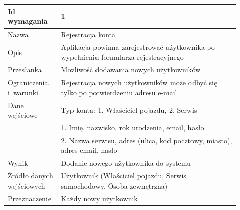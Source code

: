 \documentclass[12pt]{article}
\begin{document}
\begin{table}[H]
\begin{center}
	\begin{tabular}{|p{0.18\linewidth}|p{0.72\linewidth}|}%
	\hline
	Id wymagania 	& 1 				\\ \hline
	Nazwa			& Rejestracja konta \\ \hline
	Opis & Aplikacja powinna zarejestrować użytkownika po wypełnieniu
formularza rejestracyjnego\\ \hline
	Przesłanka & Możliwość dodawania nowych użytkowników  \\ \hline
	Ograniczenia i~warunki & Rejestracja nowych użytkowników może odbyć się tylko po potwierdzeniu adresu e-mail  \\ \hline
	Dane wejściowe & Typ konta: 1. Właściciel pojazdu, 2. Serwis \\
	&  1. Imię, nazwisko, rok urodzenia, email, hasło \\
	& 2. Nazwa serwisu, adres (ulica, kod pocztowy, miasto), adres email, hasło  \\ \hline
	Wynik & Dodanie nowego użytkownika do systemu \\ \hline
	Źródło danych wejściowych & Użytkownik (Właściciel pojazdu, Serwis samochodowy, Osoba zewnętrzna) \\ \hline
	Przeznaczenie & Każdy nowy użytkownik \\ \hline
	\end{tabular}

\end{center}
\end{table}
\end{document}

